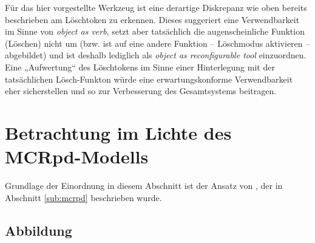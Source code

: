 Für das hier vorgestellte Werkzeug ist eine derartige Diskrepanz wie oben bereits beschrieben am Löschtoken zu erkennen. Dieses suggeriert eine Verwendbarkeit im Sinne von \emph{object as verb}, setzt aber tatsächlich die augenscheinliche Funktion (Löschen) nicht um (bzw. ist auf eine andere Funktion -- Löschmodus aktivieren -- abgebildet) und ist deshalb lediglich als \emph{object as reconfigurable tool} einzuordnen. Eine „Aufwertung“ des Löschtokens im Sinne einer Hinterlegung mit der tatsächlichen Lösch-Funkton würde eine erwartungskonforme Verwendbarkeit eher sicherstellen und so zur Verbesserung des Gesamtsystems beitragen.


\section{Betrachtung im Lichte des MCRpd-Modells} %
\label{sec:betrachtung_im_lichte_des_mcrpd_modells}

Grundlage der Einordnung in diesem Abschnitt ist der Ansatz von \citet{Ullmer00}, der in Abschnitt \ref{sub:mcrpd} beschrieben wurde.

\subsection{Abbildung}

